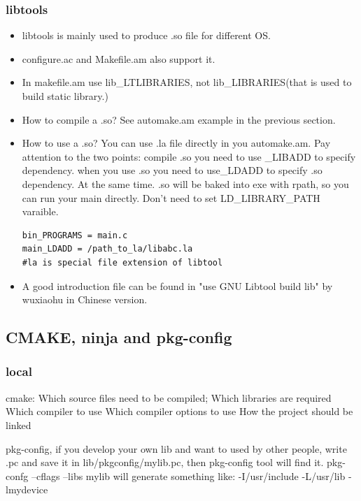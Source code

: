 \documentclass[paper=8.5in:11in, twoside, 12pt, pagesize=pdftex]{book}
\begin{document}
\subsubsection{libtools}
\begin{itemize}
\item libtools is mainly used to produce .so file for different OS.
\item configure.ac and Makefile.am also support it.

\item In makefile.am use lib\_LTLIBRARIES, not lib\_LIBRARIES(that is used to build static library.)

\item How to compile a .so? See automake.am example in the previous section.
\item How to use a .so? You can use .la file directly in you automake.am. Pay attention to the two points: compile .so you need to use \_LIBADD to specify dependency. when you use .so you need to use\_LDADD to specify .so dependency. At the same time. .so will be baked into exe with rpath, so you can run your main directly. Don't need to set LD\_LIBRARY\_PATH varaible.
\begin{verbatim}
bin_PROGRAMS = main.c
main_LDADD = /path_to_la/libabc.la 
#la is special file extension of libtool
\end{verbatim}

\item A good introduction file can be found in "use GNU Libtool build lib" by wuxiaohu in Chinese version.

\end{itemize}

\fi

\subsection{CMAKE, ninja and pkg-config}
\subsubsection{local}
cmake: Which source files need to be compiled;
Which libraries are required
Which compiler to use
Which compiler options to use
How the project should be linked

pkg-config, if you develop your own lib and want to used by other people, write .pc and save it in lib/pkgconfig/mylib.pc, then pkg-config tool will find it. pkg-confg --cflags --libs mylib will generate something like: -I/usr/include -L/usr/lib -lmydevice
\end{document}

